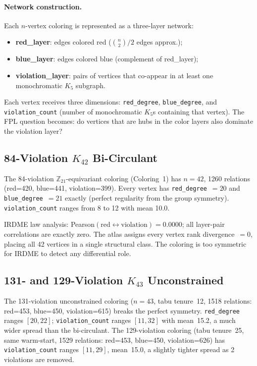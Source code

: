 \documentclass[11pt]{article}
\begin{document}
\paragraph{Network construction.}
Each $n$-vertex coloring is represented as a three-layer network:
\begin{itemize}
\item \textbf{red\_layer}: edges colored red ($\binom{n}{2}/2$ edges approx.);
\item \textbf{blue\_layer}: edges colored blue (complement of red\_layer);
\item \textbf{violation\_layer}: pairs of vertices that co-appear in at least
      one monochromatic $K_5$ subgraph.
\end{itemize}
Each vertex receives three dimensions: \texttt{red\_degree}, \texttt{blue\_degree},
and \texttt{violation\_count} (number of monochromatic $K_5$s containing that vertex).
The FPL question becomes: do vertices that are hubs in the color layers
also dominate the violation layer?

\subsection{84-Violation $K_{42}$ Bi-Circulant}

The 84-violation $\mathbb{Z}_{21}$-equivariant coloring (Coloring~1) has
$n=42$, 1260 relations (red=420, blue=441, violation=399).
Every vertex has \texttt{red\_degree}~$= 20$ and \texttt{blue\_degree}~$= 21$ exactly
(perfect regularity from the group symmetry).
\texttt{violation\_count} ranges from 8 to 12 with mean 10.0.

IRDME law analysis: Pearson$(\text{red} \leftrightarrow \text{violation}) = 0.0000$;
all layer-pair correlations are exactly zero.
The atlas assigns every vertex rank divergence~$= 0$, placing all 42 vertices
in a single structural class. The coloring is too symmetric for IRDME to
detect any differential role.

\subsection{131- and 129-Violation $K_{43}$ Unconstrained}

{\sloppy
The 131-violation unconstrained coloring ($n=43$, tabu tenure~12, 1518 relations:
red=453, blue=450, violation=615) breaks the perfect symmetry.
\texttt{red\_degree} ranges $[20,22]$; \texttt{violation\_count} ranges $[11,32]$
with mean~15.2, a much wider spread than the bi-circulant.
The 129-violation coloring (tabu tenure~25, same warm-start, 1529 relations:
red=453, blue=450, violation=626) has \texttt{violation\_count} ranges $[11,29]$,
mean~15.0, a slightly tighter spread as 2 violations are removed.
\par}
\end{document}
